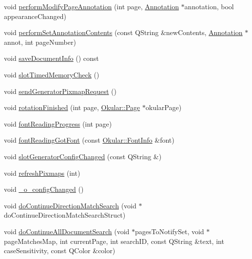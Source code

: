 \begin{DoxyCompactItemize}
void \hyperlink{classOkular_1_1DocumentPrivate_ac6a83ec146be14eee48aa70ac02f7350}{perform\+Modify\+Page\+Annotation} (int page, \hyperlink{classOkular_1_1Annotation}{Annotation} $\ast$annotation, bool appearance\+Changed)
\item 
void \hyperlink{classOkular_1_1DocumentPrivate_a0336653af57e45c3f8cade651bb2fc1a}{perform\+Set\+Annotation\+Contents} (const Q\+String \&new\+Contents, \hyperlink{classOkular_1_1Annotation}{Annotation} $\ast$annot, int page\+Number)
\item 
void \hyperlink{classOkular_1_1DocumentPrivate_a902754eb52a42389fe3abc3fa10b6b46}{save\+Document\+Info} () const 
\item 
void \hyperlink{classOkular_1_1DocumentPrivate_afc59759984a6087f17862a595903da5f}{slot\+Timed\+Memory\+Check} ()
\item 
void \hyperlink{classOkular_1_1DocumentPrivate_a0b3b0924831ddf8b6b68bd74a9d6f162}{send\+Generator\+Pixmap\+Request} ()
\item 
void \hyperlink{classOkular_1_1DocumentPrivate_a627170672257bcc215dbb5534f385f60}{rotation\+Finished} (int page, \hyperlink{classOkular_1_1Page}{Okular\+::\+Page} $\ast$okular\+Page)
\item 
void \hyperlink{classOkular_1_1DocumentPrivate_a37cc3c191fe7daa96390edb68e93c706}{font\+Reading\+Progress} (int page)
\item 
void \hyperlink{classOkular_1_1DocumentPrivate_ad04d51971658c391ab5a9dcd2f2e4f06}{font\+Reading\+Got\+Font} (const \hyperlink{classOkular_1_1FontInfo}{Okular\+::\+Font\+Info} \&font)
\item 
void \hyperlink{classOkular_1_1DocumentPrivate_ac0b99c380600e6bfaa812b6dff144ac5}{slot\+Generator\+Config\+Changed} (const Q\+String \&)
\item 
void \hyperlink{classOkular_1_1DocumentPrivate_a2de4027c4556e563bb24d465aa6ce5a6}{refresh\+Pixmaps} (int)
\item 
void \hyperlink{classOkular_1_1DocumentPrivate_a2d4639bda09007861d605f739c34c005}{\+\_\+o\+\_\+config\+Changed} ()
\item 
void \hyperlink{classOkular_1_1DocumentPrivate_aefac6c9801c005854ffe5c75e92bd05c}{do\+Continue\+Direction\+Match\+Search} (void $\ast$do\+Continue\+Direction\+Match\+Search\+Struct)
\item 
void \hyperlink{classOkular_1_1DocumentPrivate_a3052bf6dc0f8656c15d7018229953757}{do\+Continue\+All\+Document\+Search} (void $\ast$pages\+To\+Notify\+Set, void $\ast$page\+Matches\+Map, int current\+Page, int search\+I\+D, const Q\+String \&text, int case\+Sensitivity, const Q\+Color \&color)

\end{DoxyCompactItemize}
